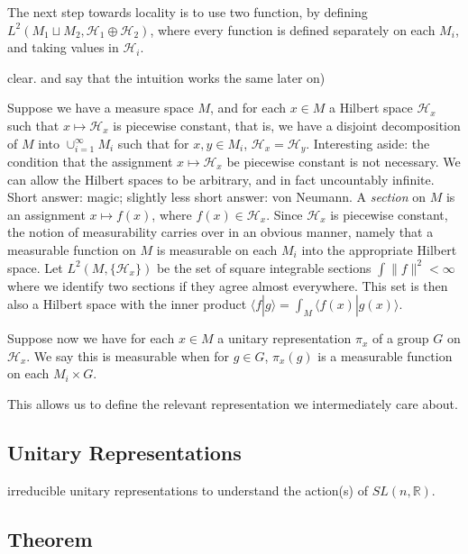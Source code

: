 \documentclass[
]{article}
\begin{document}
The next step towards locality is to use two function, by defining
\(L^2(M_1 \sqcup M_2, \mathscr{H}_1 \oplus \mathscr{H}_2)\), where every
function is defined separately on each \(M_i\), and taking values in
\(\mathscr{H}_i\).


clear. and say that the intuition works the same later on)

Suppose we have a measure space \(M\), and for each \(x \in M\) a
Hilbert space \(\mathscr{H}_x\) such that \(x \mapsto \mathscr{H}_x\) is
piecewise constant, that is, we have a disjoint decomposition of \(M\)
into \(\cup_{i=1}^{\infty} M_i\) such that for \(x,y \in M_i\),
\(\mathscr{H}_x = \mathscr{H}_y\). 
Interesting aside: the condition that the assignment
\(x \mapsto \mathscr{H}_x\) be piecewise constant is not necessary. We
can allow the Hilbert spaces to be arbitrary, and in fact uncountably
infinite. Short answer: magic; slightly less short answer: von Neumann.
A \emph{section} on \(M\) is an assignment \(x \mapsto f(x)\), where
\(f(x) \in \mathscr{H}_x\). Since \(\mathscr{H}_x\) is piecewise
constant, the notion of measurability carries over in an obvious manner,
namely that a measurable function on \(M\) is measurable on each \(M_i\)
into the appropriate Hilbert space. Let \(L^2(M, \{\mathscr{H}_x\})\) be
the set of square integrable sections \(\int \| f \|^2 < \infty\) where
we identify two sections if they agree almost everywhere. This set is
then also a Hilbert space with the inner product
\(\langle f | g \rangle = \int_M \langle f(x) | g(x) \rangle\).

Suppose now we have for each \(x \in M\) a unitary representation
\(\pi_x\) of a group \(G\) on \(\mathscr{H}_x\). We say this is
measurable when for \(g \in G\), \(\pi_x(g)\) is a measurable function
on each \(M_i \times G\).

This allows us to define the relevant representation we intermediately
care about.

\hypertarget{unitary-representations}{%
\subsection{Unitary Representations}\label{unitary-representations}}


irreducible unitary representations to understand the action(s) of
\(SL(n, \mathbb{R})\).

\hypertarget{theorem}{%
\subsection{Theorem}\label{theorem}}
\end{document}
